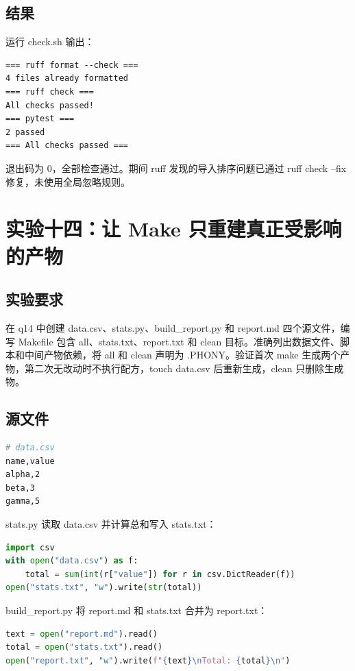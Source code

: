 \documentclass[UTF8]{ctexart}
\begin{document}
\subsection{结果}

运行 check.sh 输出：

\begin{lstlisting}
=== ruff format --check ===
4 files already formatted
=== ruff check ===
All checks passed!
=== pytest ===
2 passed
=== All checks passed ===
\end{lstlisting}

退出码为 0，全部检查通过。期间 ruff 发现的导入排序问题已通过 ruff check --fix 修复，未使用全局忽略规则。

\section{实验十四：让 Make 只重建真正受影响的产物}

\subsection{实验要求}

在 q14 中创建 data.csv、stats.py、build\_report.py 和 report.md 四个源文件，编写 Makefile 包含 all、stats.txt、report.txt 和 clean 目标。准确列出数据文件、脚本和中间产物依赖，将 all 和 clean 声明为 .PHONY。验证首次 make 生成两个产物，第二次无改动时不执行配方，touch data.csv 后重新生成，clean 只删除生成物。

\subsection{源文件}

\begin{lstlisting}[language=bash]
# data.csv
name,value
alpha,2
beta,3
gamma,5
\end{lstlisting}

stats.py 读取 data.csv 并计算总和写入 stats.txt：

\begin{lstlisting}[language=Python]
import csv
with open("data.csv") as f:
    total = sum(int(r["value"]) for r in csv.DictReader(f))
open("stats.txt", "w").write(str(total))
\end{lstlisting}

build\_report.py 将 report.md 和 stats.txt 合并为 report.txt：

\begin{lstlisting}[language=Python]
text = open("report.md").read()
total = open("stats.txt").read()
open("report.txt", "w").write(f"{text}\nTotal: {total}\n")
\end{lstlisting}
\end{document}
